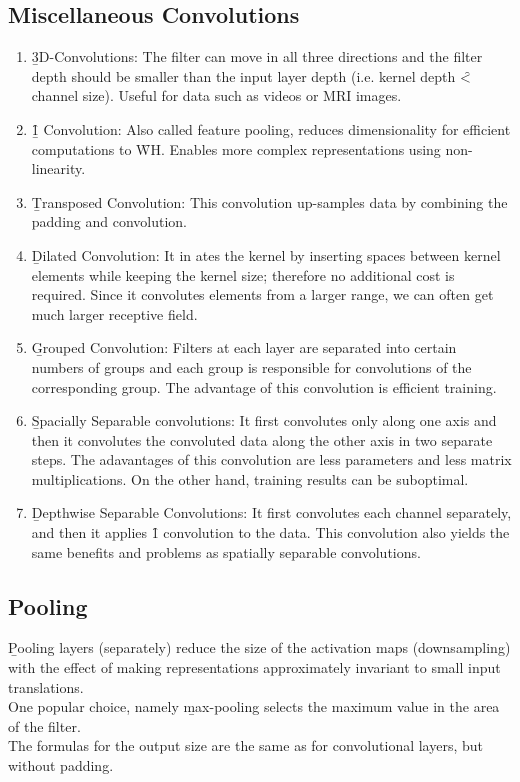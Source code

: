 \subsection{Miscellaneous Convolutions}
\begin{enumerate}
    \item \b{3D-Convolutions:} The filter can move in all three directions and the filter depth should be smaller than the input layer depth (i.e. kernel depth \f{<} channel size). Useful for data such as videos or MRI images.
    \item \b{\f{1} Convolution:} Also called feature pooling, reduces dimensionality for efficient computations to \f{W\times H}. Enables more complex representations using non-linearity.
    \item \b{Transposed Convolution:} This convolution up-samples data by combining the padding and convolution.
    \item \b{Dilated Convolution:} It in ates the kernel by inserting spaces between kernel elements while keeping the kernel size; therefore no additional cost is required. Since it convolutes elements from a larger range, we can often get much larger receptive field.
    \item \b{Grouped Convolution:} Filters at each layer are separated into certain numbers of groups and each group is responsible for convolutions of the corresponding group. The advantage of this convolution is efficient training.
    \item \b{Spacially Separable convolutions:} It first convolutes only along one axis and then it convolutes the convoluted data along the other axis in two separate steps. The adavantages of this convolution are less parameters and less matrix multiplications. On the other hand, training results can be suboptimal.
    \item \b{Depthwise Separable Convolutions:} It first convolutes each channel separately, and then it applies \f{1} convolution to the data. This convolution also yields the same benefits and problems as spatially separable convolutions.
\end{enumerate}

\subsection{Pooling}
\b{Pooling layers} (separately) reduce the size of the activation maps (downsampling) with the effect of making representations approximately invariant to small input translations.\\
One popular choice, namely \b{max-pooling} selects the maximum value in the area of the filter.\\
The formulas for the output size are the same as for convolutional layers, but without padding.